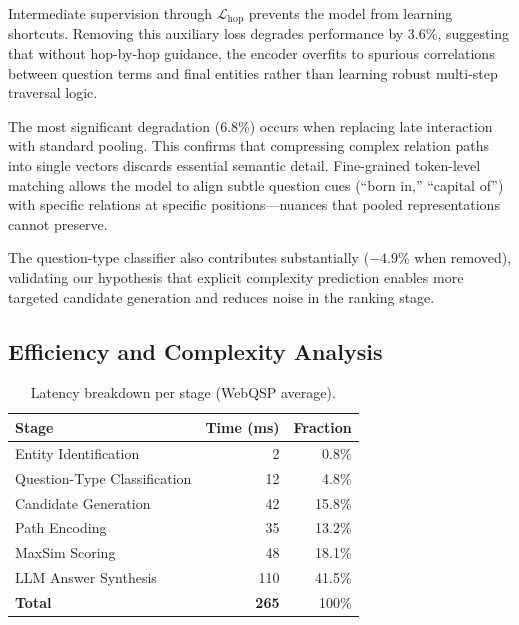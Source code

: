 \documentclass[conference]{IEEEtran}
\begin{document}
Intermediate supervision through $\mathcal{L}_{\text{hop}}$ prevents the model from learning shortcuts. Removing this auxiliary loss degrades performance by 3.6\%, suggesting that without hop-by-hop guidance, the encoder overfits to spurious correlations between question terms and final entities rather than learning robust multi-step traversal logic.

The most significant degradation (6.8\%) occurs when replacing late interaction with standard pooling. This confirms that compressing complex relation paths into single vectors discards essential semantic detail. Fine-grained token-level matching allows the model to align subtle question cues (“born in,” “capital of”) with specific relations at specific positions---nuances that pooled representations cannot preserve.

The question-type classifier also contributes substantially ($-4.9\%$ when removed), validating our hypothesis that explicit complexity prediction enables more targeted candidate generation and reduces noise in the ranking stage.

\subsection{Efficiency and Complexity Analysis}

\begin{table}[t]
\centering
\caption{Latency breakdown per stage (WebQSP average).}
\label{tab:latency}
\begin{tabular}{lrr}
\toprule
Stage & Time (ms) & Fraction \\
\midrule
Entity Identification & 2 & 0.8\% \\
Question-Type Classification & 12 & 4.8\% \\
Candidate Generation & 42 & 15.8\% \\
Path Encoding & 35 & 13.2\% \\
MaxSim Scoring & 48 & 18.1\% \\
LLM Answer Synthesis & 110 & 41.5\% \\
\midrule
\textbf{Total} & \textbf{265} & 100\% \\
\bottomrule
\end{tabular}
\end{table}
\end{document}
